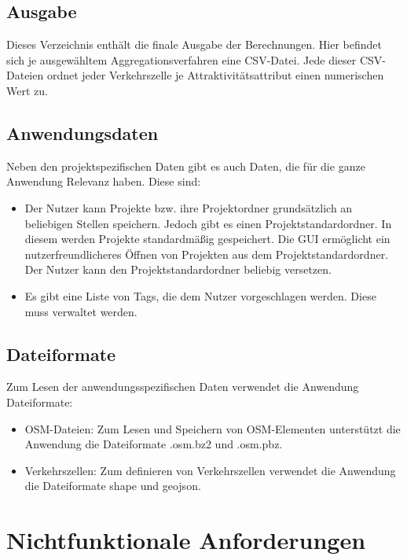 \documentclass[parskip=full]{scrartcl} %
\begin{document}
\subsection*{Ausgabe} \hypertarget{finalresult}{}
Dieses Verzeichnis enthält die finale Ausgabe der Berechnungen. Hier befindet sich je ausgewähltem Aggregationsverfahren eine CSV-Datei. Jede dieser CSV-Dateien ordnet jeder Verkehrszelle je Attraktivitätsattribut einen numerischen Wert zu.


\subsection*{Anwendungsdaten}
Neben den projektspezifischen Daten gibt es auch Daten, die für die ganze Anwendung Relevanz haben. Diese sind:
\begin{itemize}
    \item Der Nutzer kann Projekte bzw. ihre Projektordner grundsätzlich an beliebigen Stellen speichern. Jedoch gibt es einen Projektstandardordner. In diesem werden Projekte standardmäßig gespeichert. Die GUI ermöglicht ein nutzerfreundlicheres Öffnen von Projekten aus dem Projektstandardordner. Der Nutzer kann den Projektstandardordner beliebig versetzen.
    \item Es gibt eine Liste von Tags, die dem Nutzer vorgeschlagen werden. Diese muss verwaltet werden.
\end{itemize}


\subsection*{Dateiformate} \hypertarget{dataformat}{}
Zum Lesen der anwendungsspezifischen Daten verwendet die Anwendung Dateiformate:
\begin{itemize}
    \item OSM-Dateien: Zum Lesen und Speichern von OSM-Elementen unterstützt die Anwendung die Dateiformate .osm.bz2 und .osm.pbz.
    \item Verkehrszellen: Zum definieren von Verkehrszellen verwendet die Anwendung die Dateiformate shape und geojson.
\end{itemize}


\newpage







\section{Nichtfunktionale Anforderungen}
\end{document}
